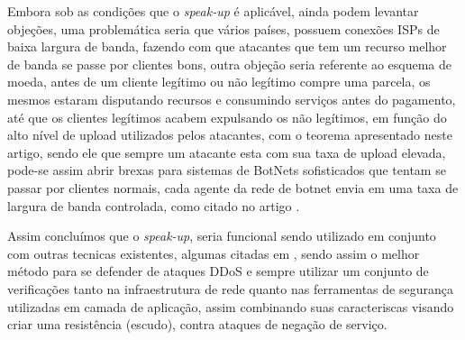 \documentclass[a4paper,12pt]{article}
\begin{document}
 \vspace{0.3cm}
 
 
 Embora sob as condições que o \textit{speak-up} é aplicável, ainda podem levantar objeções, uma problemática seria que vários países, possuem conexões ISPs de baixa largura de banda, fazendo com que atacantes que tem um recurso melhor de banda se passe por clientes bons, outra objeção seria referente ao esquema de moeda, antes de um cliente legítimo ou não legítimo compre uma parcela, os mesmos estaram disputando recursos e consumindo serviços antes do pagamento, até que os clientes legítimos acabem expulsando os não legítimos, em função do alto nível de upload utilizados pelos atacantes, com o teorema apresentado neste artigo, sendo ele que sempre um atacante esta com sua taxa de upload elevada, pode-se assim abrir brexas para sistemas de BotNets sofisticados que tentam se passar por clientes normais, cada agente da rede de botnet envia em uma taxa de largura de banda controlada, como citado no artigo \cite{7160662}.
\vspace{0.2cm}

 Assim concluímos que o \textit{speak-up}, seria funcional sendo utilizado em conjunto com outras tecnicas existentes, algumas citadas em \cite{7821722}, sendo assim  o melhor método para se defender de ataques DDoS e sempre utilizar um conjunto de verificações tanto na infraestrutura de rede quanto nas ferramentas de segurança utilizadas em camada de aplicação, assim combinando suas caracteriscas visando criar uma resistência (escudo), contra ataques de negação de serviço.  
 
 
 
\vspace{2cm}


\begin{center}
\end{center}

 
\end{document}
